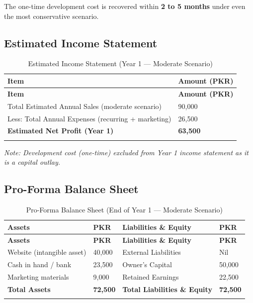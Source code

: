 \documentclass[12pt, a4paper]{article}
\begin{document}
\noindent The one-time development cost is recovered within \textbf{2 to 5 months} under even the most conservative scenario.

\subsection{Estimated Income Statement}

\begin{longtable}{@{} L{10cm} R{4.4cm} @{}}
\toprule
\textbf{Item} & \textbf{Amount (PKR)} \\
\midrule
\endfirsthead
\toprule
\textbf{Item} & \textbf{Amount (PKR)} \\
\midrule
\endhead
Total Estimated Annual Sales (moderate scenario) & 90,000 \\[4pt]
Less: Total Annual Expenses (recurring + marketing) & 26,500 \\
\midrule
\textbf{Estimated Net Profit (Year 1)} & \textbf{63,500} \\
\bottomrule
\caption{Estimated Income Statement (Year 1 — Moderate Scenario)}
\end{longtable}

\textit{Note: Development cost (one-time) excluded from Year 1 income statement as it is a capital outlay.}

\subsection{Pro-Forma Balance Sheet}

\begin{longtable}{@{} L{5.2cm} R{2.8cm} L{5.2cm} R{2.8cm} @{}}
\toprule
\textbf{Assets} & \textbf{PKR} & \textbf{Liabilities \& Equity} & \textbf{PKR} \\
\midrule
\endfirsthead
\toprule
\textbf{Assets} & \textbf{PKR} & \textbf{Liabilities \& Equity} & \textbf{PKR} \\
\midrule
\endhead
Website (intangible asset) & 40,000 & External Liabilities & Nil \\[4pt]
Cash in hand / bank & 23,500 & Owner's Capital & 50,000 \\[4pt]
Marketing materials & 9,000 & Retained Earnings & 22,500 \\
\midrule
\textbf{Total Assets} & \textbf{72,500} & \textbf{Total Liabilities \& Equity} & \textbf{72,500} \\
\bottomrule
\caption{Pro-Forma Balance Sheet (End of Year 1 — Moderate Scenario)}
\end{longtable}
\end{document}
